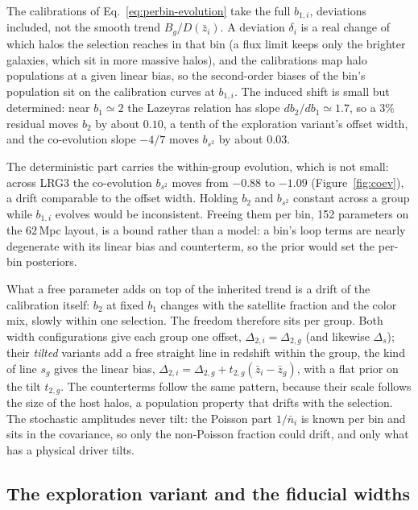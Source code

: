 \documentclass[11pt]{article}
\newcommand{\bone}{b_1}            %
\newcommand{\btwo}{b_2}            %
\newcommand{\bs}{b_{s^2}}          %
\begin{document}
The calibrations of Eq.~\eqref{eq:perbin-evolution} take the full
$b_{1,i}$, deviations included, not the smooth trend $B_g/D(\bar{z}_i)$.
A deviation $\delta_i$ is a real change of which halos the selection
reaches in that bin (a flux limit keeps only the brighter galaxies,
which sit in more massive halos), and the calibrations map halo
populations at a given linear bias, so the second-order biases of the
bin's population sit on the calibration curves at $b_{1,i}$.  The
induced shift is small but determined: near $\bone \simeq 2$ the
Lazeyras relation has slope $d\btwo/d\bone \simeq 1.7$, so a $3\%$
residual moves $\btwo$ by about $0.10$, a tenth of the exploration
variant's offset
width, and the co-evolution slope $-4/7$ moves $\bs$ by about $0.03$.

The deterministic part carries the within-group evolution, which is
not small: across LRG3 the co-evolution $\bs$ moves from $-0.88$ to
$-1.09$ (Figure~\ref{fig:coev}), a drift comparable to the offset
width.  Holding $\btwo$ and $\bs$ constant across a group while
$b_{1,i}$ evolves would be inconsistent.  Freeing them per bin, 152
parameters on the $62$\,Mpc layout, is a bound rather than a model: a
bin's loop terms are nearly degenerate with its linear bias and
counterterm, so the prior would set the per-bin posteriors.

What a free parameter adds on top of the inherited trend is a drift of
the calibration itself: $\btwo$ at fixed $\bone$ changes with the
satellite fraction and the color mix, slowly within one selection.  The
freedom therefore sits per group.  Both width configurations give
each group one
offset, $\Delta_{2,i} = \Delta_{2,g}$ (and likewise $\Delta_s$);
their \emph{tilted} variants add a free straight
line in redshift within the group, the kind of line $s_g$ gives the
linear bias,
$\Delta_{2,i} = \Delta_{2,g} + t_{2,g}(\bar{z}_i - \bar{z}_g)$, with a
flat prior on the tilt $t_{2,g}$.  The counterterms follow the same
pattern, because their scale follows the size of the host halos, a population
property that drifts with the selection.  The stochastic amplitudes
never tilt: the Poisson part $1/\bar{n}_i$ is known per bin and sits in
the covariance, so only the non-Poisson fraction could drift, and
only what has a physical driver tilts.

\subsection{The exploration variant and the fiducial widths}
\label{sec:models}
\end{document}
